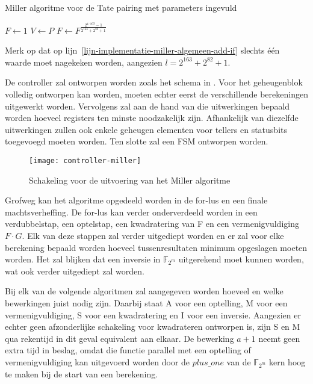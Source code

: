 \begin{algorithm}[h]
	\caption{Miller algoritme voor de Tate pairing met parameters ingevuld}
	\label{algoritme-implementatie-miller-algemeen}
	$F \gets 1$\;
	$V \gets P$\;
	$F \gets F^{\frac{2^{4 \cdot 163} - 1}{2^{163} + 2^{82} + 1}}$\;
\end{algorithm}

Merk op dat op lijn~\ref{lijn-implementatie-miller-algemeen-add-if} slechts \'e\'en waarde moet nagekeken worden, aangezien $l = 2^{163} + 2^{82} + 1$.

De controller zal ontworpen worden zoals het schema in . Voor het geheugenblok volledig ontworpen kan worden, moeten echter eerst de verschillende berekeningen uitgewerkt worden. Vervolgens zal aan de hand van die uitwerkingen bepaald worden hoeveel registers ten minste noodzakelijk zijn. Afhankelijk van diezelfde uitwerkingen zullen ook enkele geheugen elementen voor tellers en statusbits toegevoegd moeten worden. Ten slotte zal een FSM ontworpen worden.

\begin{figure}[h]
	\centering
		\texttt{[image: controller-miller]}
		\caption{Schakeling voor de uitvoering van het Miller algoritme\label{figuur-implementatie-miller-controller}}
\end{figure}

Grofweg kan het algoritme opgedeeld worden in de for-lus  en een finale machtsverheffing. De for-lus kan verder onderverdeeld worden in een verdubbelstap, een optelstap, een kwadratering van F en een vermenigvuldiging $F \cdot G$. Elk van deze stappen zal verder uitgediept worden en er zal voor elke berekening bepaald worden hoeveel tussenresultaten minimum opgeslagen moeten worden. Het zal blijken dat een inversie in $\mathbb{F}_{2^m}$ uitgerekend moet kunnen worden, wat ook verder uitgediept zal worden.

Bij elk van de volgende algoritmen zal aangegeven worden hoeveel en welke bewerkingen juist nodig zijn. Daarbij staat \textsf{A} voor een optelling, \textsf{M} voor een vermenigvuldiging, \textsf{S} voor een kwadratering en \textsf{I} voor een inversie. Aangezien er echter geen afzonderlijke schakeling voor kwadrateren ontworpen is, zijn \textsf{S} en \textsf{M} qua rekentijd in dit geval equivalent aan elkaar. De bewerking $a + 1$ neemt geen extra tijd in beslag, omdat die functie parallel met een optelling of vermenigvuldiging kan uitgevoerd worden door de $plus\_one$ van de $\mathbb{F}_{2^m}$ kern hoog te maken bij de start van een berekening.

